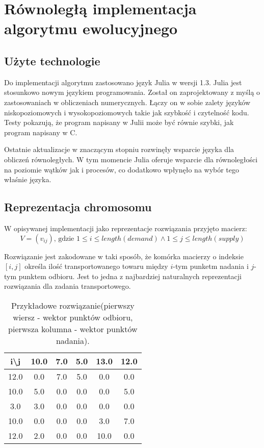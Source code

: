 \chapter{Równoległą implementacja algorytmu ewolucyjnego}
\thispagestyle{chapterBeginStyle}

\section{Użyte technologie}
Do implementacji algorytmu zastosowano język Julia\cite{JULIA-PUB} w wersji 1.3. Julia jest stosunkowo nowym językiem programowania. Został on zaprojektowany 
z myślą o zastosowaniach w obliczeniach numerycznych. Łączy on w sobie zalety języków niskopoziomowych i wysokopoziomowych takie jak szybkość 
i czytelność kodu. Testy pokazują, że program napisany w Julii może być równie szybki, jak program napisany w C\cite{JULIA-PERFORMANCE}. 

Ostatnie aktualizacje w znaczącym stopniu rozwinęły wsparcie języka dla obliczeń równoległych. W tym momencie Julia oferuje wsparcie dla 
równoległości na poziomie wątków jak i procesów, co dodatkowo wpłynęło na wybór tego właśnie języka. 


\section{Reprezentacja chromosomu}
W opisywanej implementacji jako reprezentacje rozwiązania przyjęto macierz:
$$V = (v_{ij}) \text{, gdzie } 1 \le i \le length(demand) \land 1 \le j \le length(supply)$$

Rozwiązanie jest zakodowane w taki sposób, że komórka macierzy o indeksie $[i, j]$ określa ilość transportowanego towaru 
między $i$-tym punketm nadania i $j$-tym punktem odbioru. Jest to jedna z najbardziej naturalnych reprezentacji rozwiązania 
dla zadania transportowego.

\begin{table}[h!]
    \begin{center}
        \begin{tabular}{c|ccccc}
            i\textbackslash{j} & 10.0 & 7.0 & 5.0 & 13.0 & 12.0 \\ 
            \hline
            12.0 & 0.0 & 7.0 & 5.0 & 0.0 & 0.0 \\
            10.0 & 5.0 & 0.0 & 0.0 & 0.0 & 5.0 \\
            3.0 & 3.0 & 0.0 & 0.0 & 0.0 & 0.0 \\
            10.0 & 0.0 & 0.0 & 0.0 & 3.0 & 7.0 \\
            12.0 & 2.0 & 0.0 & 0.0 & 10.0 & 0.0 \\
        \end{tabular}
    \end{center}
    \caption{Przykładowe rozwiązanie(pierwszy wiersz - wektor punktów odbioru, pierwsza kolumna - wektor punktów nadania).}
\end{table}

